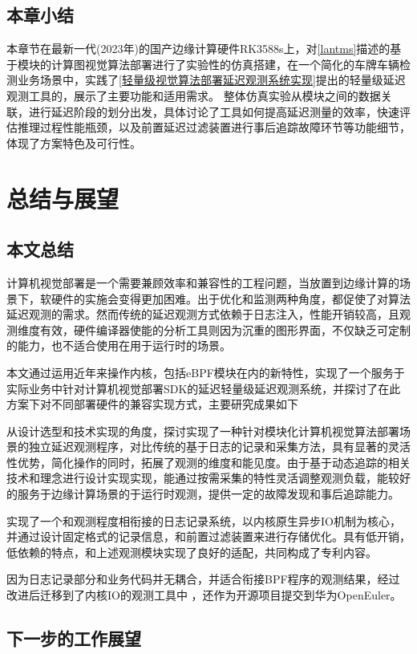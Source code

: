 \documentclass[master]{shtthesis}
\begin{document}
\section{本章小结}
本章节在最新一代(2023年)的国产边缘计算硬件RK3588s上，对\ref{lantms}描述的基于模块的计算图视觉算法部署进行了实验性的仿真搭建，在一个简化的车牌车辆检测业务场景中，实践了\ref{轻量级视觉算法部署延迟观测系统实现}提出的轻量级延迟观测工具的，展示了主要功能和适用需求。
整体仿真实验从模块之间的数据关联，进行延迟阶段的划分出发，具体讨论了工具如何提高延迟测量的效率，快速评估推理过程性能瓶颈，以及前置延迟过滤装置进行事后追踪故障环节等功能细节，体现了方案特色及可行性。

\chapter{总结与展望}
\section{本文总结}
计算机视觉部署是一个需要兼顾效率和兼容性的工程问题，当放置到边缘计算的场景下，软硬件的实施会变得更加困难。出于优化和监测两种角度，都促使了对算法延迟观测的需求。然而传统的延迟观测方式依赖于日志注入，性能开销较高，且观测维度有效，硬件编译器使能的分析工具则因为沉重的图形界面，不仅缺乏可定制的能力，也不适合使用在用于运行时的场景。

本文通过运用近年来操作内核，包括eBPF模块在内的新特性，实现了一个服务于实际业务中针对计算机视觉部署SDK的延迟轻量级延迟观测系统，并探讨了在此方案下对不同部署硬件的兼容实现方式，主要研究成果如下

从设计选型和技术实现的角度，探讨实现了一种针对模块化计算机视觉算法部署场景的独立延迟观测程序，对比传统的基于日志的记录和采集方法，具有显著的灵活性优势，简化操作的同时，拓展了观测的维度和能见度。由于基于动态追踪的相关技术和理念进行设计实现实现，能通过按需采集的特性灵活调整观测负载，能较好的服务于边缘计算场景的于运行时观测，提供一定的故障发现和事后追踪能力。

实现了一个和观测程度相衔接的日志记录系统，以内核原生异步IO机制为核心，并通过设计固定格式的记录信息，和前置过滤装置来进行存储优化。具有低开销，低依赖的特点，和上述观测模块实现了良好的适配，共同构成了专利\cite{patent}内容。

因为日志记录部分和业务代码并无耦合，并适合衔接BPF程序的观测结果，经过改进后迁移到了内核IO的观测工具中 ，还作为开源项目提交到华为OpenEuler。
\section{下一步的工作展望}
\end{document}
